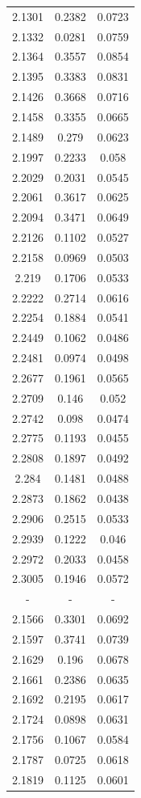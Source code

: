 \documentclass[twocolumn,tight,times]{aastex63}
\begin{document}
\begin{center}
\begin{longtable}{c|c|c}
2.1301 & 0.2382 & 0.0723 \\
2.1332 & 0.0281 & 0.0759 \\
2.1364 & 0.3557 & 0.0854 \\
2.1395 & 0.3383 & 0.0831 \\
2.1426 & 0.3668 & 0.0716 \\
2.1458 & 0.3355 & 0.0665 \\
2.1489 & 0.279 & 0.0623 \\
2.1997 & 0.2233 & 0.058 \\
2.2029 & 0.2031 & 0.0545 \\
2.2061 & 0.3617 & 0.0625 \\
2.2094 & 0.3471 & 0.0649 \\
2.2126 & 0.1102 & 0.0527 \\
2.2158 & 0.0969 & 0.0503 \\
2.219 & 0.1706 & 0.0533 \\
2.2222 & 0.2714 & 0.0616 \\
2.2254 & 0.1884 & 0.0541 \\
2.2449 & 0.1062 & 0.0486 \\
2.2481 & 0.0974 & 0.0498 \\
2.2677 & 0.1961 & 0.0565 \\
2.2709 & 0.146 & 0.052 \\
2.2742 & 0.098 & 0.0474 \\
2.2775 & 0.1193 & 0.0455 \\
2.2808 & 0.1897 & 0.0492 \\
2.284 & 0.1481 & 0.0488 \\
2.2873 & 0.1862 & 0.0438 \\
2.2906 & 0.2515 & 0.0533 \\
2.2939 & 0.1222 & 0.046 \\
2.2972 & 0.2033 & 0.0458 \\
2.3005 & 0.1946 & 0.0572 \\
- & - & - \\
2.1566 & 0.3301 & 0.0692 \\
2.1597 & 0.3741 & 0.0739 \\
2.1629 & 0.196 & 0.0678 \\
2.1661 & 0.2386 & 0.0635 \\
2.1692 & 0.2195 & 0.0617 \\
2.1724 & 0.0898 & 0.0631 \\
2.1756 & 0.1067 & 0.0584 \\
2.1787 & 0.0725 & 0.0618 \\
2.1819 & 0.1125 & 0.0601 \\

\end{longtable}
\end{center}
\end{document}
